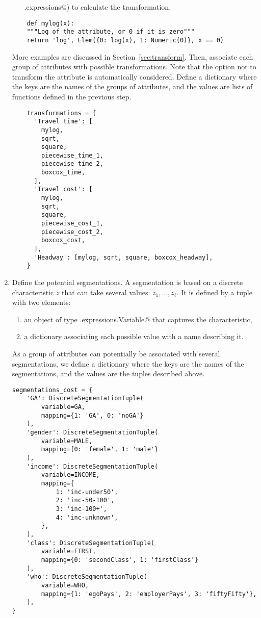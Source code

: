 \documentclass[12pt,a4paper]{article}
\begin{document}
\begin{enumerate}
\begin{enumerate}
    \lstinline@biogeme.expressions@) to calculate the transformation.
  \end{enumerate}
  \begin{lstlisting}
    def mylog(x):
    """Log of the attribute, or 0 if it is zero"""
    return 'log', Elem({0: log(x), 1: Numeric(0)}, x == 0)
  \end{lstlisting}
  More examples are discussed in Section~\ref{sec:transform}.
Then, associate each group of attributes with possible
  transformations. Note that the option not to transform the attribute
  is automatically considered. Define a dictionary where the keys are the
  names of the groups of attributes, and the values are lists of
  functions defined in the previous step.
  \begin{lstlisting}
    transformations = {
      'Travel time': [
        mylog,
        sqrt,
        square,
        piecewise_time_1,
        piecewise_time_2,
        boxcox_time,
      ],
      'Travel cost': [
        mylog,
        sqrt,
        square,
        piecewise_cost_1,
        piecewise_cost_2,
        boxcox_cost,
      ],
      'Headway': [mylog, sqrt, square, boxcox_headway],
    }

  \end{lstlisting}

\item \label{item:segment}Define the  potential segmentations. A segmentation is based on
  a discrete characteristic $z$ that can take several values:
  $z_1,\ldots, z_\ell$. It is defined by a tuple with two elements:
  \begin{enumerate}
  \item an object of type \lstinline@biogeme.expressions.Variable@
    that captures the characteristic,
  \item a dictionary associating each possible value with a name
    describing it.
  \end{enumerate}
  As a group of attributes can potentially be associated with several
  segmentations, we define a dictionary where the keys are the names
  of the segmentations, and the values are the tuples described above.
  \begin{lstlisting}
segmentations_cost = {
    'GA': DiscreteSegmentationTuple(
        variable=GA,
        mapping={1: 'GA', 0: 'noGA'}
    ),
    'gender': DiscreteSegmentationTuple(
        variable=MALE,
        mapping={0: 'female', 1: 'male'}
    ),
    'income': DiscreteSegmentationTuple(
        variable=INCOME,
        mapping={
            1: 'inc-under50',
            2: 'inc-50-100',
            3: 'inc-100+',
            4: 'inc-unknown',
        },
    ),
    'class': DiscreteSegmentationTuple(
        variable=FIRST,
        mapping={0: 'secondClass', 1: 'firstClass'}
    ),
    'who': DiscreteSegmentationTuple(
        variable=WHO,
        mapping={1: 'egoPays', 2: 'employerPays', 3: 'fiftyFifty'},
    ),
}
  \end{lstlisting}


\end{enumerate}
\end{document}
